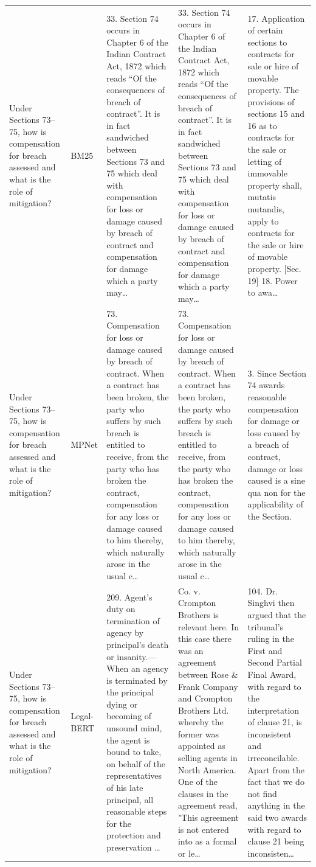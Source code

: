\documentclass[11pt]{article}
\begin{document}
\begin{xltabular}{\textwidth}{|p{3.2cm}|p{2.2cm}|Y|Y|Y|}
        Under Sections 73–75, how is compensation for breach assessed and what is the role of mitigation? & BM25 & 33. Section 74 occurs in Chapter 6 of the Indian Contract Act, 1872 which reads “Of the consequences of breach of contract”. It is in fact sandwiched between Sections 73 and 75 which deal with compensation for loss or damage caused by breach of contract and compensation for damage which a party may… & 33. Section 74 occurs in Chapter 6 of the Indian Contract Act, 1872 which reads “Of the consequences of breach of contract”. It is in fact sandwiched between Sections 73 and 75 which deal with compensation for loss or damage caused by breach of contract and compensation for damage which a party may… & 17. Application of certain sections to contracts for sale or hire of movable property. The provisions of sections 15 and 16 as to contracts for the sale or letting of immovable property shall, mutatis mutandis, apply to contracts for the sale or hire of movable property.  [Sec. 19] 18. Power to awa… \\ 
        Under Sections 73–75, how is compensation for breach assessed and what is the role of mitigation? & MPNet & 73. Compensation for loss or damage caused by breach of contract. When a contract has been broken, the party who suffers by such breach is entitled to receive, from the party who has broken the contract, compensation for any loss or damage caused to him thereby, which naturally arose in the usual c… & 73. Compensation for loss or damage caused by breach of contract. When a contract has been broken, the party who suffers by such breach is entitled to receive, from the party who has broken the contract, compensation for any loss or damage caused to him thereby, which naturally arose in the usual c… & 3. Since Section 74 awards reasonable compensation for damage or loss caused by a breach of contract, damage or loss caused is a sine qua non for the applicability of the Section. \\ 
        Under Sections 73–75, how is compensation for breach assessed and what is the role of mitigation? & Legal-BERT & 209. Agent's duty on termination of agency by principal's death or insanity.—When an agency is terminated by the principal dying or becoming of unsound mind, the agent is bound to take, on behalf of the representatives of his late principal, all reasonable steps for the protection and preservation … & Co. v. Crompton Brothers is relevant here. In this case there was an agreement between Rose \& Frank Company and Crompton Brothers Ltd. whereby the former was appointed as selling agents in North America. One of the clauses in the agreement read, "This agreement is not entered into as a formal or le… & 104. Dr. Singhvi then argued that the tribunal's ruling in the First and Second Partial Final Award, with regard to the interpretation of clause 21, is inconsistent and irreconcilable. Apart from the fact that we do not find anything in the said two awards with regard to clause 21 being inconsisten… \\ 

\end{xltabular}
\end{document}
